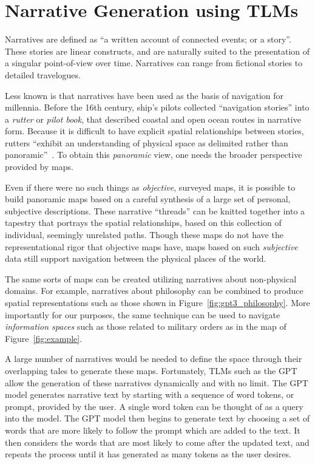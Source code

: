 \documentclass[11pt,dvipdfm]{article}
\begin{document}
\section{Narrative Generation using TLMs}
Narratives are defined as \enquote{a written account of connected events; or a story}. These stories are linear constructs, and are naturally suited to the presentation of a singular point-of-view over time. Narratives can range from fictional stories to detailed travelogues. 

Less known is that narratives have been used as the basis of navigation for millennia. Before the 16th century, ship's pilots collected \enquote{navigation stories} into a \textit{rutter} or \textit{pilot book}, that described coastal and open ocean routes in narrative form. Because it is difficult to have explicit spatial relationships between stories, rutters \enquote{exhibit an understanding of physical space as delimited rather than panoramic}~\cite{goldie2015early}. To obtain this \textit{panoramic} view, one needs the broader perspective provided by maps. 

Even if there were no such things as \textit{objective}, surveyed maps, it is possible to build panoramic maps based on a careful synthesis of a large set of personal, subjective descriptions. These narrative \enquote{threads} can be knitted together into a tapestry that portrays the spatial relationships, based on this collection of individual, seemingly unrelated paths. Though these maps do not have the representational rigor that objective maps have, maps based on such \textit{subjective} data still support navigation between the physical places of the world.

The same sorts of maps can be created utilizing narratives about non-physical domains. For example, narratives about philosophy can be combined to produce spatial representations such as those shown in Figure~\ref{fig:gpt3_philosophy}. More importantly for our purposes, the same technique  can be used to navigate \textit{information spaces} such as those related to military orders as in the map of Figure~\ref{fig:example}.

A large number of narratives would be needed to define the space through their overlapping tales to generate these maps. Fortunately, TLMs such as the GPT allow the generation of these narratives dynamically and with no limit. The GPT model generates narrative text by starting with a sequence of word tokens, or prompt, provided by the user. A single word token can be thought of as a query into the model. The GPT model then begins to generate text by choosing a set of words that are more likely to follow the prompt which are added to the text. It then considers the words that are most likely to come after the updated text, and repeats the process until it has generated as many tokens as the user desires. 
\end{document}
